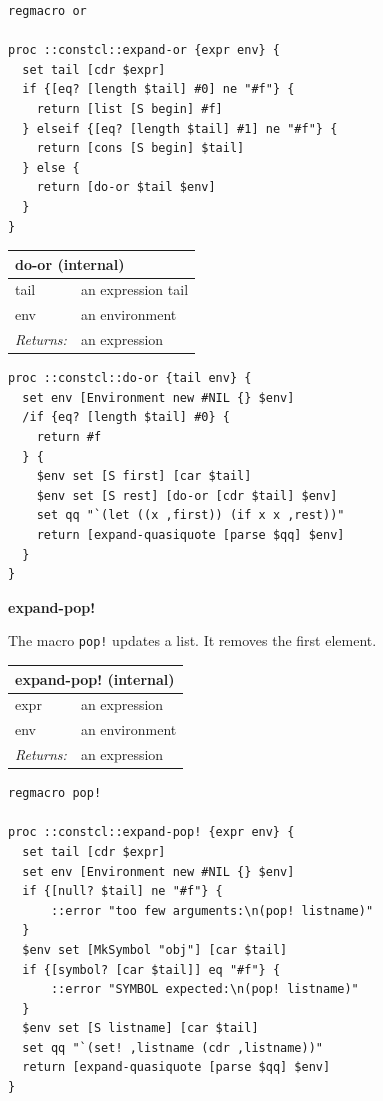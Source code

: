 \documentclass[twoside,9pt]{report}
\begin{document}
\noindent\makebox[\linewidth]{\rule{\linewidth}{0.4pt}}
\begin{lstlisting}
regmacro or
 
proc ::constcl::expand-or {expr env} {
  set tail [cdr $expr]
  if {[eq? [length $tail] #0] ne "#f"} {
    return [list [S begin] #f]
  } elseif {[eq? [length $tail] #1] ne "#f"} {
    return [cons [S begin] $tail]
  } else {
    return [do-or $tail $env]
  }
}
\end{lstlisting}
\noindent\makebox[\linewidth]{\rule{\linewidth}{0.4pt}}
\begin{tabular}{ |l l| }
\hline
\multicolumn{2}{|l|}{do-or (internal)} \\
\hline
tail & an expression tail \\
env & an environment \\
\textit{Returns:} & an expression \\
\hline
\end{tabular}

\noindent\makebox[\linewidth]{\rule{\linewidth}{0.4pt}}
\begin{lstlisting}
proc ::constcl::do-or {tail env} {
  set env [Environment new #NIL {} $env]
  /if {eq? [length $tail] #0} {
    return #f
  } {
    $env set [S first] [car $tail]
    $env set [S rest] [do-or [cdr $tail] $env]
    set qq "`(let ((x ,first)) (if x x ,rest))"
    return [expand-quasiquote [parse $qq] $env]
  }
}
\end{lstlisting}
\noindent\makebox[\linewidth]{\rule{\linewidth}{0.4pt}}

\textbf{expand-pop!}


The macro \texttt{pop!} updates a list. It removes the first element.

\begin{tabular}{ |l l| }
\hline
\multicolumn{2}{|l|}{expand-pop! (internal)} \\
\hline
expr & an expression \\
env & an environment \\
\textit{Returns:} & an expression \\
\hline
\end{tabular}

\noindent\makebox[\linewidth]{\rule{\linewidth}{0.4pt}}
\begin{lstlisting}
regmacro pop!
 
proc ::constcl::expand-pop! {expr env} {
  set tail [cdr $expr]
  set env [Environment new #NIL {} $env]
  if {[null? $tail] ne "#f"} {
      ::error "too few arguments:\n(pop! listname)"
  }
  $env set [MkSymbol "obj"] [car $tail]
  if {[symbol? [car $tail]] eq "#f"} {
      ::error "SYMBOL expected:\n(pop! listname)"
  }
  $env set [S listname] [car $tail]
  set qq "`(set! ,listname (cdr ,listname))"
  return [expand-quasiquote [parse $qq] $env]
}
\end{lstlisting}
\noindent\makebox[\linewidth]{\rule{\linewidth}{0.4pt}}
\end{document}
